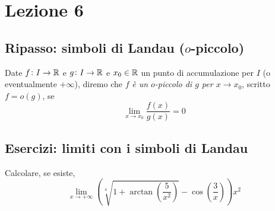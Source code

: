 \section{Lezione 6}
\subsection{Ripasso: simboli di Landau (\texorpdfstring{$o$}{o}-piccolo)}
\begin{definition}
    \label{def:5.4}
    Date $f\colon I \to \amsbb{R}$ e $g\colon I \to \amsbb{R}$ e $x_0\in\amsbb{R}$ un punto di accumulazione per $I$ (o eventualmente $+\infty$), diremo che $f$ \emph{è un $o$-piccolo di $g$ per $x\to x_0$}, scritto $f=o(g)$, se
    \[
    \lim_{x\to x_0} \frac{f(x)}{g(x)} = 0
    \]
\end{definition}
\subsection{Esercizi: limiti con i simboli di Landau}
\begin{exercise}
    \label{ex:5.4}
    Calcolare, se esiste,
    \[
    \lim_{x\to +\infty} \left(\sqrt[4]{1+   \arctan\left(\frac{5}{x^2}\right)}-\cos\left(\frac{3}{x}\right)\right)x^2
    \]
\end{exercise}
